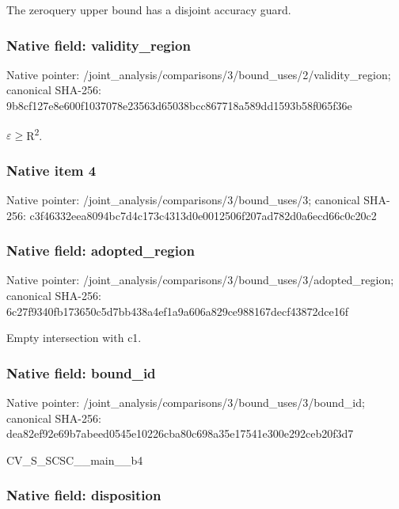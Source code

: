 \documentclass[10pt,a4paper]{article}
\begin{document}
The zeroquery upper bound has a disjoint accuracy guard.


\subsubsection{Native field: validity\_region}


Native pointer: /joint\_analysis/comparis\allowbreak{}ons/3/bound\_uses/2/valid\allowbreak{}ity\_region; canonical SHA-256: 9b8cf127e8e600f1037078e2\allowbreak{}3563d65038bcc867718a589d\allowbreak{}d1593b58f065f36e


\ensuremath{\varepsilon}\ensuremath{\ge}R\textsuperscript{2}.


\subsubsection{Native item 4}


Native pointer: /joint\_analysis/comparis\allowbreak{}ons/3/bound\_uses/3; canonical SHA-256: c3f46332eea8094bc7d4c173\allowbreak{}c4313d0e0012506f207ad782\allowbreak{}d0a6ecd66c0c20c2



\subsubsection{Native field: adopted\_region}


Native pointer: /joint\_analysis/comparis\allowbreak{}ons/3/bound\_uses/3/adopt\allowbreak{}ed\_region; canonical SHA-256: 6c27f9340fb173650c5d7bb4\allowbreak{}38a4ef1a9a606a829ce98816\allowbreak{}7decf43872dce16f


Empty intersection with c1.


\subsubsection{Native field: bound\_id}


Native pointer: /joint\_analysis/comparis\allowbreak{}ons/3/bound\_uses/3/bound\allowbreak{}\_id; canonical SHA-256: dea82ef92e69b7abeed0545e\allowbreak{}10226cba80c698a35e17541e\allowbreak{}300e292ceb20f3d7


CV\_S\_SCSC\_\_main\_\_b4


\subsubsection{Native field: disposition}
\end{document}
